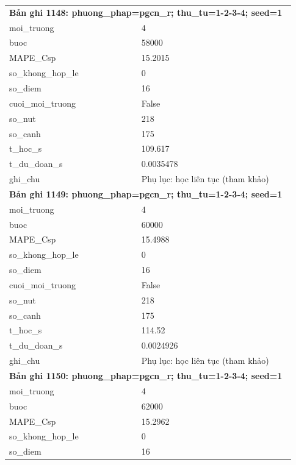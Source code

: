 \begin{longtable}{p{0.43\linewidth}p{0.50\linewidth}}
\midrule
\multicolumn{2}{p{0.95\linewidth}}{\textbf{Bản ghi 1148: phuong\_phap=pgcn\_r; thu\_tu=1-2-3-4; seed=1}} \\
moi\_\allowbreak truong & 4 \\
buoc & 58000 \\
MAPE\_\allowbreak Csp & 15.2015 \\
so\_\allowbreak khong\_\allowbreak hop\_\allowbreak le & 0 \\
so\_\allowbreak diem & 16 \\
cuoi\_\allowbreak moi\_\allowbreak truong & False \\
so\_\allowbreak nut & 218 \\
so\_\allowbreak canh & 175 \\
t\_\allowbreak hoc\_\allowbreak s & 109.617 \\
t\_\allowbreak du\_\allowbreak doan\_\allowbreak s & 0.0035478 \\
ghi\_\allowbreak chu & Phụ lục: học liên tục (tham khảo) \\
\midrule
\multicolumn{2}{p{0.95\linewidth}}{\textbf{Bản ghi 1149: phuong\_phap=pgcn\_r; thu\_tu=1-2-3-4; seed=1}} \\
moi\_\allowbreak truong & 4 \\
buoc & 60000 \\
MAPE\_\allowbreak Csp & 15.4988 \\
so\_\allowbreak khong\_\allowbreak hop\_\allowbreak le & 0 \\
so\_\allowbreak diem & 16 \\
cuoi\_\allowbreak moi\_\allowbreak truong & False \\
so\_\allowbreak nut & 218 \\
so\_\allowbreak canh & 175 \\
t\_\allowbreak hoc\_\allowbreak s & 114.52 \\
t\_\allowbreak du\_\allowbreak doan\_\allowbreak s & 0.0024926 \\
ghi\_\allowbreak chu & Phụ lục: học liên tục (tham khảo) \\
\midrule
\multicolumn{2}{p{0.95\linewidth}}{\textbf{Bản ghi 1150: phuong\_phap=pgcn\_r; thu\_tu=1-2-3-4; seed=1}} \\
moi\_\allowbreak truong & 4 \\
buoc & 62000 \\
MAPE\_\allowbreak Csp & 15.2962 \\
so\_\allowbreak khong\_\allowbreak hop\_\allowbreak le & 0 \\
so\_\allowbreak diem & 16 \\

\end{longtable}
